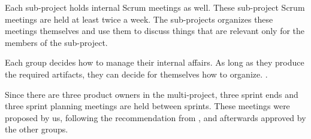 Each sub-project holds internal Scrum meetings as well. These sub-project Scrum meetings are held at least twice a week. The sub-projects organizes these meetings themselves and use them to discuss things that are relevant only for the members of the sub-project. 

Each group decides how to manage their internal affairs. As long as they produce the required artifacts, they can decide for themselves how to organize. .

Since there are three product owners in the multi-project, three sprint ends and three sprint planning meetings are held between sprints. These meetings were proposed by us, following the recommendation from \textcite{bird_davies_2007}, and afterwards approved by the other groups.

